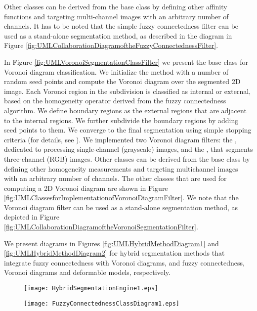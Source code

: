 Other classes can be derived from the base class by defining other affinity
functions and targeting multi-channel images with an arbitrary number of
channels. It has to be noted that the simple fuzzy connectedness filter can be
used as a stand-alone segmentation method, as described in the diagram in
Figure \ref{fig:UMLCollaborationDiagramoftheFuzzyConnectednessFilter}.

In Figure \ref{fig:UMLVoronoiSegmentationClassFilter} we present the base class for
Voronoi diagram classification. We initialize the method with a number of random
seed points and compute the Voronoi diagram over the segmented 2D image. Each
Voronoi region in the subdivision is classified as internal or external,
based on the homogeneity operator derived from the fuzzy connectedness
algorithm.  We define boundary regions as the external regions that are
adjacent to the internal regions.  We further subdivide the boundary regions
by adding seed points to them. We converge to the final segmentation
using simple stopping criteria (for details, see \cite{Imielinska2001}). We
implemented two Voronoi diagram filters: the
, dedicated to processing single-channel
(grayscale) images, and the , that segments
three-channel (RGB) images. Other classes can be derived from the base class
by defining other homogeneity measurements and targeting multichannel images
with an arbitrary number of channels.  The other classes that are used for
computing a 2D Voronoi diagram are shown in Figure
\ref{fig:UMLClassesforImplementationofVoronoiDiagramFilter}. We note that the
Voronoi diagram filter can be used as a stand-alone segmentation method, as
depicted in Figure
\ref{fig:UMLCollaborationDiagramoftheVoronoiSegmentationFilter}.

 We present diagrams in Figures \ref{fig:UMLHybridMethodDiagram1} and 
 \ref{fig:UMLHybridMethodDiagram2} for hybrid segmentation methods
 that integrate fuzzy connectedness with Voronoi diagrams, and fuzzy
 connectedness, Voronoi diagrams and deformable models, respectively.


\begin{figure}
\center
\texttt{[image: HybridSegmentationEngine1.eps]}
\label{fig:ComponentsofaHybridSegmentationApproach}
\end{figure}


\begin{figure}
\center
\texttt{[image: FuzzyConnectednessClassDiagram1.eps]}
\label{fig:UMLClassDiagramoftherFuzzyConnectednessFilter}
\end{figure}


